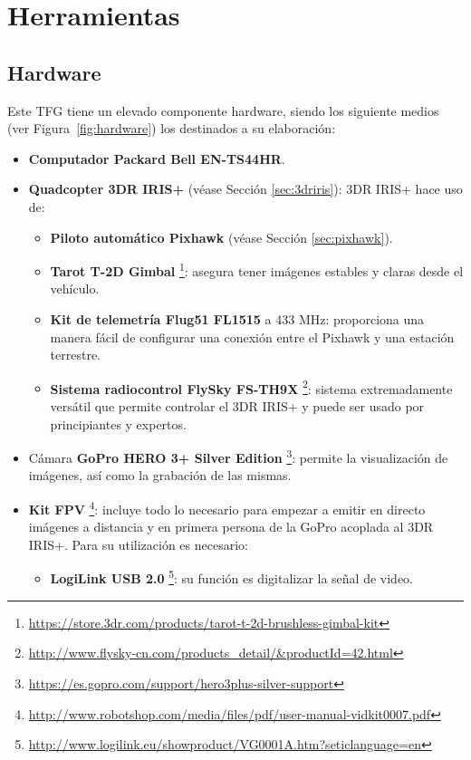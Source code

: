 \section{Herramientas}
\label{sec:herramientastfg}

\subsection{Hardware}
\label{sec:hardware}

Este \acs{TFG} tiene un elevado componente hardware, siendo los siguiente medios (ver Figura~\ref{fig:hardware}) los destinados a su elaboración:

\begin{itemize}
\item \textbf{Computador Packard Bell EN-TS44HR}.
\item \textbf{Quadcopter 3DR IRIS+} (véase Sección \ref{sec:3driris}): 3DR IRIS+ hace uso de:
	\begin{itemize}
	\item \textbf{Piloto automático Pixhawk} (véase Sección \ref{sec:pixhawk}).
	\item \textbf{Tarot T-2D Gimbal} \footnote{\url{https://store.3dr.com/products/tarot-t-2d-brushless-gimbal-kit}}: asegura tener imágenes estables y claras desde el vehículo.
	\item \textbf{Kit de telemetría Flug51 FL1515} a 433 MHz: proporciona una manera fácil de configurar una conexión entre el Pixhawk y una estación terrestre.
	\item \textbf{Sistema radiocontrol FlySky FS-TH9X} \footnote{\url{http://www.flysky-cn.com/products_detail/&productId=42.html}}: sistema extremadamente versátil que permite controlar el 3DR IRIS+ y puede ser usado por principiantes y expertos.
	\end{itemize}
\item Cámara \textbf{GoPro HERO 3+ Silver Edition} \footnote{\url{https://es.gopro.com/support/hero3plus-silver-support}}: permite la visualización de imágenes, así como la grabación de las mismas.
\item \textbf{Kit \acs{FPV}} \footnote{\url{http://www.robotshop.com/media/files/pdf/user-manual-vidkit0007.pdf}}: incluye todo lo necesario para empezar a emitir en directo imágenes a distancia y en primera persona de la GoPro acoplada al 3DR IRIS+. Para su utilización es necesario:
	\begin{itemize}
	\item \textbf{LogiLink USB 2.0} \footnote{\url{http://www.logilink.eu/showproduct/VG0001A.htm?seticlanguage=en}}: su función es digitalizar la señal de video. \\
	\end{itemize}
\end{itemize}

